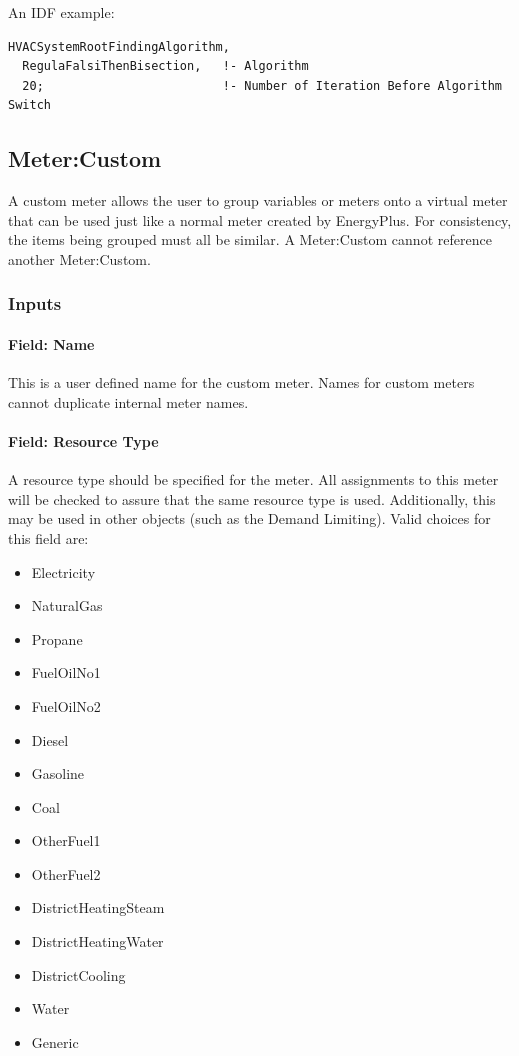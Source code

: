 An IDF example:

\begin{lstlisting}
HVACSystemRootFindingAlgorithm,
  RegulaFalsiThenBisection,   !- Algorithm
  20;                         !- Number of Iteration Before Algorithm Switch
\end{lstlisting}

\subsection{Meter:Custom}\label{metercustom}

A custom meter allows the user to group variables or meters onto a virtual meter that can be used just like a normal meter created by EnergyPlus. For consistency, the items being grouped must all be similar. A Meter:Custom cannot reference another Meter:Custom.

\subsubsection{Inputs}\label{inputs-17-008}

\paragraph{Field: Name}\label{field-name-043}

This is a user defined name for the custom meter. Names for custom meters cannot duplicate internal meter names.

\paragraph{Field: Resource Type}\label{field-fuel-type-004}

A resource type should be specified for the meter. All assignments to this meter will be checked to assure that the same resource type is used. Additionally, this may be used in other objects (such as the Demand Limiting). Valid choices for this field are:

\begin{itemize}
    \item
    Electricity
    \item
    NaturalGas
    \item
    Propane
    \item
    FuelOilNo1
    \item
    FuelOilNo2
    \item
    Diesel
    \item
    Gasoline
    \item
    Coal
    \item
    OtherFuel1
    \item
    OtherFuel2
    \item
    DistrictHeatingSteam
    \item
    DistrictHeatingWater
    \item
    DistrictCooling
    \item
    Water
    \item
    Generic
\end{itemize}

